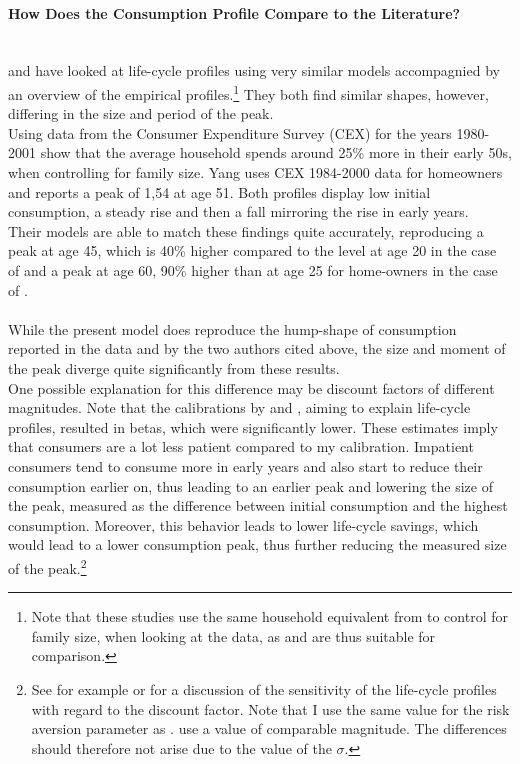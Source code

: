 \documentclass[a4paper,12pt,legno]{article}
\newcommand{\myparagraph}[1]{\paragraph{#1}\mbox{}\\}
\begin{document}
\myparagraph{How Does the Consumption Profile Compare to the Literature?} \cite{FV&K2011} and \cite{yang2009} have looked at life-cycle profiles using very similar models accompagnied by an overview of the empirical profiles.\footnote{Note that these studies use the same household equivalent from \cite{fernandez2007consumption} to control for family size, when looking at the data, as \cite{hintermaier2011} and are thus suitable for comparison.} They both find similar shapes, however, differing in the size and period of the peak.\\
Using data from the Consumer Expenditure Survey (CEX) for the years 1980-2001 \cite{FV&K2011} show that the average household spends around 25\% more in their early 50s, when controlling for family size. Yang uses CEX 1984-2000 data for homeowners and reports a peak of 1,54 at age 51. Both profiles display low initial consumption, a steady rise and then a fall mirroring the rise in early years. \\
Their models are able to match these findings quite accurately, reproducing a peak  at age 45, which is 40\% higher compared to the level at age 20 in the case of \cite{FV&K2011} and a peak at age 60, 90\% higher than at age 25 for home-owners in the case of \cite{yang2009}. 
\\ \\
While the present model does reproduce the hump-shape of consumption reported in the data and by the two authors cited above, the size and moment of the peak diverge quite significantly from these results. \\
One possible explanation for this difference may be discount factors of different magnitudes. Note that the calibrations by \cite{FV&K2011} and  \cite{yang2009}, aiming to explain life-cycle profiles, resulted in betas, which were significantly lower. These estimates imply that consumers are a lot less patient compared to my calibration. Impatient consumers tend to consume more in early years and also start to reduce their consumption earlier on, thus leading to an earlier peak and lowering the size of the peak, measured as the difference between initial consumption and the highest consumption. Moreover, this behavior leads to lower life-cycle savings, which would lead to a lower consumption peak, thus further reducing the measured size of the peak.\footnote{See for example \cite{Gourinchas&Parker2002} or \cite{cagetti2003} for a discussion of the sensitivity of the life-cycle profiles with regard to the discount factor. Note that I use the same value for the risk aversion parameter as \cite{yang2009}. \cite{FV&K2011} use a value of comparable magnitude. The differences should therefore not arise due to the value of the $\sigma$.}
\end{document}
